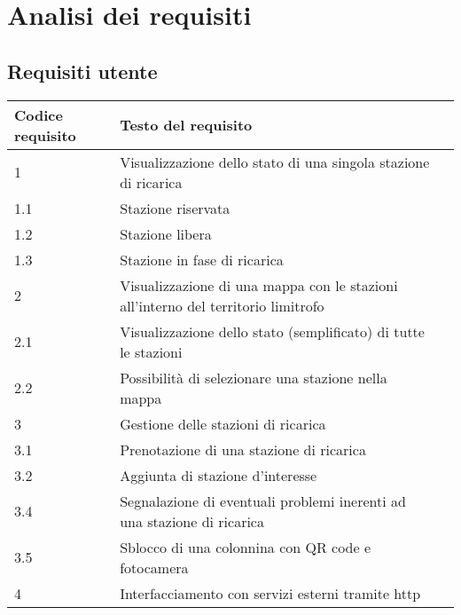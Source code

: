 
\section{Analisi dei requisiti}

\subsection*{Requisiti utente}

\begin{tabular}{l|ll}
    Codice requisito & Testo del requisito                                                               \\
    \hline
    1                & Visualizzazione dello stato di una singola stazione di ricarica                   \\
    1.1              & Stazione riservata                                                                \\
    1.2              & Stazione libera                                                                   \\
    1.3              & Stazione in fase di ricarica                                                      \\
    2                & Visualizzazione di una mappa con le stazioni all'interno del territorio limitrofo \\
    2.1              & Visualizzazione dello stato (semplificato) di tutte le stazioni                   \\
    2.2              & Possibilità di selezionare una stazione nella mappa                               \\
    3                & Gestione delle stazioni di ricarica                                               \\
    3.1              & Prenotazione di una stazione di ricarica                                          \\
    3.2              & Aggiunta di stazione d'interesse                                                  \\
    3.4              & Segnalazione di eventuali problemi inerenti ad una stazione di ricarica           \\
    3.5              & Sblocco di una colonnina con QR code e fotocamera                                 \\
    4                & Interfacciamento con servizi esterni tramite http                                 \\
    \hline
\end{tabular}

